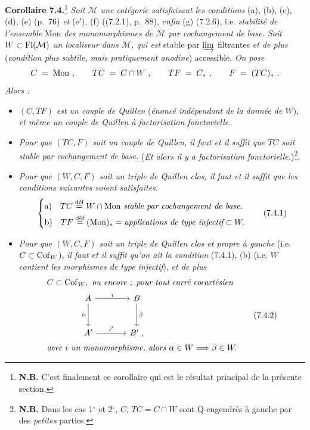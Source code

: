 \textbf{Corollaire 7.4.}\footnote[35]{\textbf{N.B.} C'est finalement ce corollaire qui est le résultat principal de la présente section.} \textit{Soit $\mathcal{M}$ une catégorie satisfaisant les conditions} (a), (b), (c), (d), (e) (p.~76) \textit{et} (e$'$), (f) ((7.2.1), p.~88), \textit{enfin} (g) (7.2.6), i.e. \textit{stabilité de l'ensemble} Mon \textit{des monomorphismes de $\mathcal{M}$ par cochangement de base. Soit $W\subset \mathrm{Fl}(\mathcal{M})$ un localiseur dans $\mathcal{M}$, qui est} stable par $\varinjlim$ filtrantes \textit{et de plus} (\textit{condition plus subtile, mais pratiquement anodine}) accessible. \textit{On pose}
\[
C \;=\; \mathrm{Mon}\ , \qquad TC \;=\; C\cap W\ , \qquad TF \;=\; C_*\ , \qquad F \;=\; (TC)_*\ .
\]
\textit{Alors :}
\begin{itemize}[leftmargin=*]
\item[1$^\circ$)] \textit{$(C,TF)$ est un couple de Quillen} (\textit{énoncé indépendant de la donnée de $W$}), \textit{et même un couple de Quillen à factorisation fonctorielle.}
\item[2$^\circ$)] \textit{Pour que $(TC,F)$ soit un couple de Quillen, il faut et il suffit que $TC$ soit stable par cochangement de base.} (\textit{Et alors il y a factorisation fonctorielle.})\footnote[36]{\textbf{N.B.} Dans les cas 1$^\circ$ et 2$^\circ$, $C$, $TC=C\cap W$ sont Q-engendrés à gauche par des \textit{petites} parties.}.
\item[3$^\circ$)] \textit{Pour que $(W,C,F)$ soit un triple de Quillen clos, il faut et il suffit que les conditions suivantes soient satisfaites.}
\[
\left\{
\begin{aligned}
&\text{a)}\quad TC \overset{\text{déf}}{=} W\cap \Mon\ \textit{stable par cochangement de base.}\\
&\text{b)}\quad TF \overset{\text{déf}}{=} (\Mon)_* = \textit{applications de type injectif} \subset W.
\end{aligned}
\right.
\tag*{(7.4.1)}
\]
\item[4$^\circ$)] \textit{Pour que $(W,C,F)$ soit un triple de Quillen clos et propre à gauche} (i.e. $C\subset \mathrm{Cof}_W$), \textit{il faut et il suffit qu'on ait la condition} (7.4.1), (b) (i.e. \textit{$W$ contient les morphismes de type injectif}), \textit{et de plus}
\[
\begin{aligned}
&C\subset \Cof_W,\ \textit{ou encore : pour tout carré cocartésien}\\
&\qquad\qquad\begin{tikzcd}[ampersand replacement=\&, row sep=large, column sep=large]
A \arrow[r, "i"] \arrow[d, "\alpha"'] \& B \arrow[d, "\beta"] \\
A' \arrow[r, "i'"] \& B'\ ,
\end{tikzcd}\\
&\textit{avec $i$ un monomorphisme, alors } \alpha\in W \Longrightarrow \beta\in W.
\end{aligned}
\tag*{(7.4.2)}
\]


\end{itemize}
